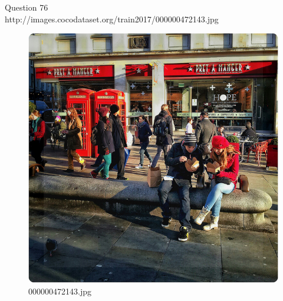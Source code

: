 Question 76\\
http://images.cocodataset.org/train2017/000000472143.jpg
\begin{figure}[h]
    \centering
    \includegraphics[width=0.8\linewidth]{../image set/hard/000000472143.jpg}
    \caption{000000472143.jpg}
\end{figure}
